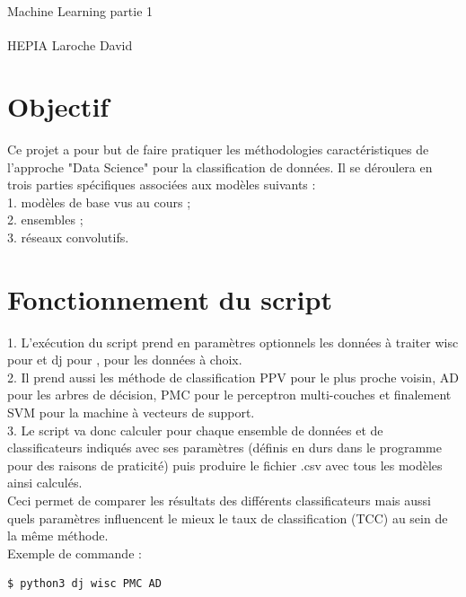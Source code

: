 \documentclass[10pt,letterpaper]{article}
\begin{document}
\vspace*{0.2in}

\centerline{\Large{Machine Learning partie 1}}%
\vspace{10mm}

HEPIA Laroche David\textsuperscript{}

\section*{Objectif}
Ce projet a pour but de faire pratiquer les méthodologies caractéristiques de l’approche "Data
Science" pour la classification de données. Il se déroulera en trois parties spécifiques associées
aux modèles suivants :
\\
1. modèles de base vus au cours ;
\\
2. ensembles ;
\\
3. réseaux convolutifs.


\section*{Fonctionnement du script}

\hspace{\parindent} 1. L’exécution du script prend en paramètres optionnels les données à traiter wisc pour  et dj pour , pour les données à choix.\\
2. Il prend aussi les méthode de classification PPV pour le plus proche voisin, AD pour les arbres de décision, PMC pour le perceptron multi-couches et finalement SVM pour la machine à vecteurs de support.\\
3. Le script va donc calculer pour chaque ensemble de données et de classificateurs indiqués avec ses paramètres (définis en durs dans le programme pour des raisons de praticité) puis produire le fichier .csv avec tous les modèles ainsi calculés.\\
\vspace{1mm}
Ceci permet de comparer les résultats des différents classificateurs mais aussi quels paramètres influencent le mieux le taux de classification (TCC) au sein de la même méthode.\\
\vspace{1mm}
Exemple de commande :
\begin{lstlisting}[language=bash]
  $ python3 dj wisc PMC AD
\end{lstlisting}
\end{document}
